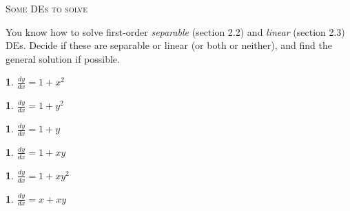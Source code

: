 \documentclass[11pt]{article}
\numberwithin{equation}{section}
\numberwithin{equation}{section}
\theoremstyle{definition}
\newcounter{exno}
\newtheorem{exercise}[exno]{}
\begin{document}
\sloppy
{}
\pagestyle{fancy}
\large
\centerline{{\Large \textsc{Some DEs to solve}}}
\medskip
\noindent
You know how to solve first-order \emph{separable} (section 2.2) and \emph{linear} (section 2.3) DEs.  Decide if these are separable or linear (or both or neither), and find the general solution if possible.

\bigskip
\begin{exercise}
     $\displaystyle \frac{dy}{dx} = 1 + x^2$
\end{exercise}
\vfill
\begin{exercise}
     $\displaystyle \frac{dy}{dx} = 1 + y^2$
\end{exercise}
\vfill
\begin{exercise}
     $\displaystyle \frac{dy}{dx} = 1 + y$
\end{exercise}
\vfill
\begin{exercise}
     $\displaystyle \frac{dy}{dx} = 1 + x y$
\end{exercise}
\vfill
\begin{exercise}
     $\displaystyle \frac{dy}{dx} = 1 + x y^2$
\end{exercise}
\vfill
\begin{exercise}
     $\displaystyle \frac{dy}{dx} = x + x y$
\end{exercise}
\vfill
\end{document}
